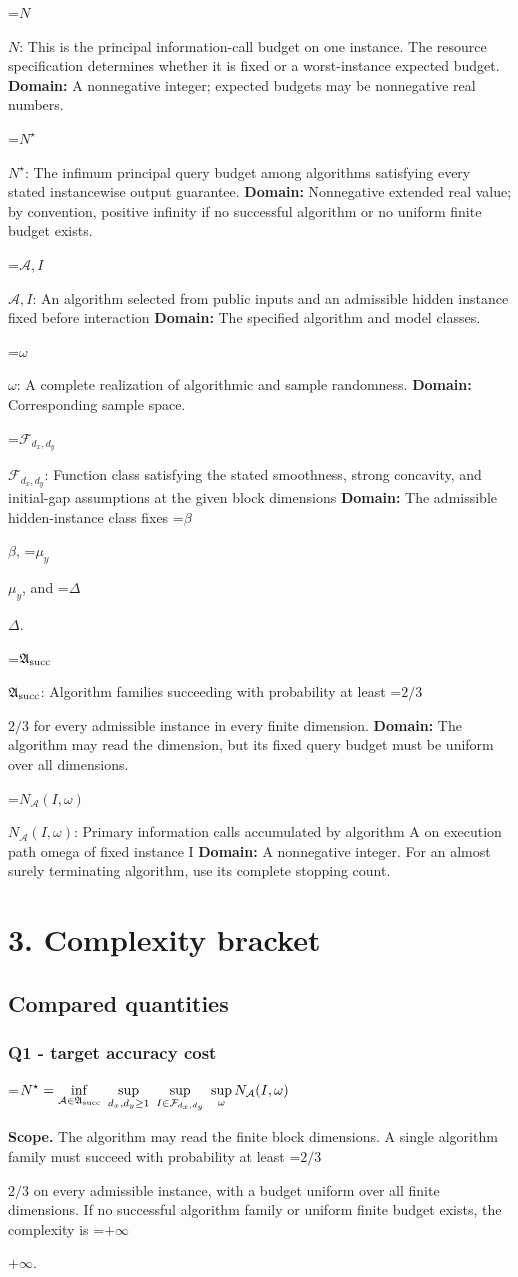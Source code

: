 \documentclass[10pt,a4paper]{article}
\newcommand{\AtlasMath}[1]{\par\begingroup\centering\setbox0=\hbox{$\displaystyle #1$}\ifdim\wd0>1.4\linewidth\typeout{ATLAS WIDE FORMULA: \the\wd0}\fi\ifdim\wd0>\linewidth\resizebox{\linewidth}{!}{\box0}\else\box0\fi\par\endgroup}
\newcommand{\AtlasInlineMath}[1]{\begingroup\setbox0=\hbox{$#1$}\ifdim\wd0>.4\linewidth\endgroup\AtlasMath{#1}\else\endgroup$#1$\fi}
\begin{document}
\AtlasInlineMath{N}: This is the principal information-call budget on one instance. The resource specification determines whether it is fixed or a worst-instance expected budget. \textbf{Domain:} A nonnegative integer; expected budgets may be nonnegative real numbers.

\AtlasInlineMath{N^\star}: The infimum principal query budget among algorithms satisfying every stated instancewise output guarantee. \textbf{Domain:} Nonnegative extended real value; by convention, positive infinity if no successful algorithm or no uniform finite budget exists.

\AtlasInlineMath{\mathcal A,I}: An algorithm selected from public inputs and an admissible hidden instance fixed before interaction \textbf{Domain:} The specified algorithm and model classes.

\AtlasInlineMath{\omega}: A complete realization of algorithmic and sample randomness. \textbf{Domain:} Corresponding sample space.

\AtlasInlineMath{\mathcal F_{d_x,d_y}}: Function class satisfying the stated smoothness, strong concavity, and initial-gap assumptions at the given block dimensions \textbf{Domain:} The admissible hidden-instance class fixes \AtlasInlineMath{\beta}, \AtlasInlineMath{\mu_y}, and \AtlasInlineMath{\Delta}.

\AtlasInlineMath{\mathfrak A_{\rm succ}}: Algorithm families succeeding with probability at least \AtlasInlineMath{2/3} for every admissible instance in every finite dimension. \textbf{Domain:} The algorithm may read the dimension, but its fixed query budget must be uniform over all dimensions.

\AtlasInlineMath{N_{\mathcal A}(I,\omega)}: Primary information calls accumulated by algorithm A on execution path omega of fixed instance I \textbf{Domain:} A nonnegative integer. For an almost surely terminating algorithm, use its complete stopping count.

\section{3. Complexity bracket}
\subsection{Compared quantities}
\subsubsection{Q1 - target accuracy cost}
\AtlasMath{N^\star=\inf_{\mathcal A\in\mathfrak A_{\rm succ}}\ \sup_{d_x,d_y\ge1}\ \sup_{I\in\mathcal F_{d_x,d_y}}\ \sup_\omega N_{\mathcal A}(I,\omega)}
\textbf{Scope.} The algorithm may read the finite block dimensions. A single algorithm family must succeed with probability at least \AtlasInlineMath{2/3} on every admissible instance, with a budget uniform over all finite dimensions. If no successful algorithm family or uniform finite budget exists, the complexity is \AtlasInlineMath{+\infty}.
\end{document}
